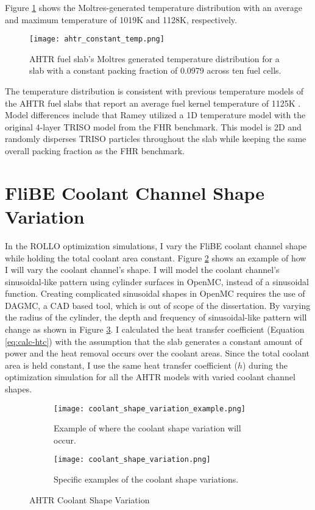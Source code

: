 Figure \ref{fig:ahtr_constant_temp} shows the Moltres-generated temperature 
distribution with an average and maximum temperature of 1019K and 1128K, 
respectively.
\begin{figure}[H]
    \centering
    \texttt{[image: ahtr\_constant\_temp.png]}
    \caption{AHTR fuel slab's Moltres generated temperature distribution for a 
    slab with a constant packing fraction of 0.0979 across ten fuel cells.}  
    \label{fig:ahtr_constant_temp}
\end{figure}
The temperature distribution is consistent with previous temperature models of 
the AHTR fuel slabs that report an average fuel kernel temperature of 1125K 
\cite{ramey_methodology_2021}. 
Model differences include that Ramey \cite{ramey_methodology_2021} utilized a 
1D temperature model with the original 4-layer TRISO model from the FHR benchmark. 
This model is 2D and randomly disperses TRISO particles throughout the 
slab while keeping the same overall packing fraction as the FHR benchmark. 

\pagebreak

\section{FliBE Coolant Channel Shape Variation}
In the ROLLO optimization simulations, I vary the FliBE coolant channel shape 
while holding the total coolant area constant.  
Figure \ref{fig:ahtr-coolant-shape-variation-1} shows an example of how I will 
vary the coolant channel's shape. 
I will model the coolant channel's sinusoidal-like pattern using cylinder 
surfaces in OpenMC, instead of a sinusoidal function. 
Creating complicated sinusoidal shapes in OpenMC requires the use of DAGMC, a 
CAD based tool, which is out of scope of the dissertation.
By varying the radius of the cylinder, the depth and frequency of sinusoidal-like 
pattern will change as shown in Figure \ref{fig:ahtr-coolant-shape-variation-2}. 
I calculated the heat transfer coefficient (Equation \ref{eq:calc-htc}) with 
the assumption that the slab generates a constant amount of power and the heat 
removal occurs over the coolant areas.
Since the total coolant area is held constant, I use the 
same heat transfer coefficient ($h$) during the optimization simulation 
for all the AHTR models with varied coolant channel shapes.   
\begin{figure}[H]
    \centering
    \begin{subfigure}{\textwidth}
        \texttt{[image: coolant\_shape\_variation\_example.png]}
        \caption{Example of where the coolant shape variation will occur.}
        \label{fig:ahtr-coolant-shape-variation-1}
    \end{subfigure}
    \begin{subfigure}{\textwidth}
        \texttt{[image: coolant\_shape\_variation.png]}
        \caption{Specific examples of the coolant shape variations.}
        \label{fig:ahtr-coolant-shape-variation-2}
    \end{subfigure}
    \caption{AHTR Coolant Shape Variation}  
    \label{fig:ahtr-coolant-shape-variation}
\end{figure}
